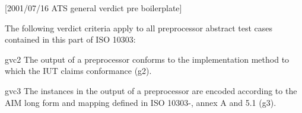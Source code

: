 [2001/07/16 ATS general verdict pre boilerplate]

    The following verdict criteria apply to all preprocessor
abstract test cases contained in this part of ISO 10303:

gvc2 The output of a preprocessor conforms
     to the implementation method to which the IUT claims conformance (g2).

gvc3 The instances in the output of a preprocessor are encoded according
     to the AIM \Express{} long form and mapping \maptableorspec{}
     defined in ISO 10303-\theAPpartno, annex A and 5.1 (g3).
\par

\endinput
